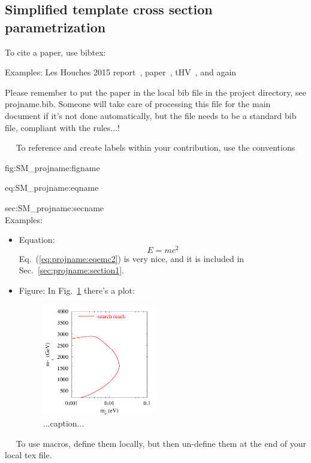 \subsection{Simplified template cross section parametrization}
\label{sec:higgseft:section3}







To cite a paper, use bibtex:

Examples: Les Houches 2015 report~\cite{Badger:2016bpw},
paper~\cite{Aaboud:2016ffv}, tHV~\cite{'tHooft:1972fi}, and again~\cite{'tHooft:1972fi}

Please remember to put the paper in the local bib file in the project
directory, see projname.bib. Someone will take care of processing this
file for the main document if it's not done automatically, but the
file needs to be a standard bib file, compliant with the rules...!

~\newline~
To reference and create labels within your contribution, use the conventions

fig:SM\_projname:figname

eq:SM\_projname:eqname

sec:SM\_projname:secname\\
Examples:
\begin{itemize}
\item Equation:
  \begin{equation}
    E = m c^2
    \label{eq:projname:eqemc2}
  \end{equation}
  Eq.~(\ref{eq:projname:eqemc2}) is very nice, and it is included in Sec.~\ref{sec:projname:section1}.
\item Figure: In Fig.~\ref{fig:projname:plot1} there's a plot:
\begin{figure}[htbp]
  \begin{center}
    \includegraphics[width=5cm]{Fig1.pdf}
    \caption{...caption...}
    \label{fig:projname:plot1}
  \end{center}
\end{figure}
\end{itemize}
~\newline~
To use macros, define them locally, but then un-define them at the end of your local tex file.


